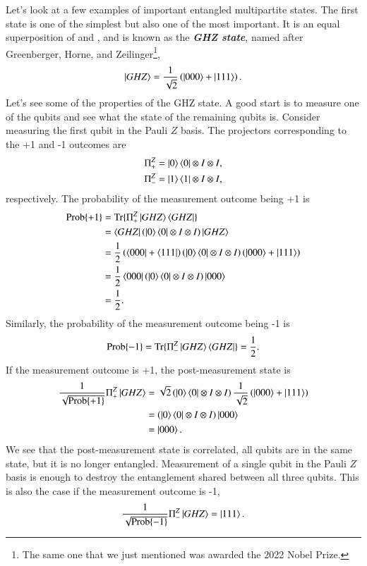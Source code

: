 Let's look at a few examples of important entangled multipartite states.
The first state is one of the simplest but also one of the most important.
It is an equal superposition of  and , and is known as the \emph{\textbf{GHZ state}}, named after Greenberger, Horne, and Zeilinger\footnote{The same one that we just mentioned was awarded the 2022 Nobel Prize.},
\begin{equation}
    \left| GHZ \right\rangle = \frac{1}{\sqrt{2}} \left( \left| 000 \right\rangle + \left| 111 \right\rangle \right).
\end{equation}
Let's see some of the properties of the GHZ state.
A good start is to measure one of the qubits and see what the state of the remaining qubits is.
Consider measuring the first qubit in the Pauli $Z$ basis.
The projectors corresponding to the +1 and -1 outcomes are
\begin{align}
    \Pi^Z_+ & = \left| 0 \right\rangle\left\langle 0 \right| \otimes I \otimes I, \\
    \Pi^Z_- & = \left| 1 \right\rangle\left\langle 1 \right| \otimes I \otimes I,
\end{align}
respectively.
The probability of the measurement outcome being +1 is
\begin{align}
    \text{Prob} \{+1\} & = \text{Tr} \{ \Pi^Z_+ \left| GHZ \right\rangle\left\langle GHZ \right| \} \nonumber\\
    & = \left\langle GHZ \right| \left( \left| 0 \right\rangle\left\langle 0 \right| \otimes I \otimes I \right) \left| GHZ \right\rangle \nonumber\\
    & = \frac{1}{2} \left( \left\langle 000 \right| + \left\langle 111 \right| \right) \left( \left| 0 \right\rangle\left\langle 0 \right| \otimes I \otimes I \right) \left( \left| 000 \right\rangle + \left| 111 \right\rangle \right) \nonumber\\
     & = \frac{1}{2} \left\langle 000 \right| \left( \left| 0 \right\rangle\left\langle 0 \right| \otimes I \otimes I \right) \left| 000 \right\rangle \nonumber\\
     & = \frac{1}{2}.
\end{align}
Similarly, the probability of the measurement outcome being -1 is
\begin{equation}
    \text{Prob}\{-1\} = \text{Tr}\{\Pi^Z_-\left| GHZ \right\rangle\left\langle GHZ \right|\} = \frac{1}{2}.
\end{equation}
If the measurement outcome is +1, the post-measurement state is
\begin{align}
    \frac{1}{\sqrt{\text{Prob}\{+1\}}} \Pi^Z_+ \left| GHZ \right\rangle & = \sqrt{2} \left( \left| 0 \right\rangle\left\langle 0 \right| \otimes I \otimes I \right) \frac{1}{\sqrt{2}} \left( \left| 000 \right\rangle + \left| 111 \right\rangle \right) \nonumber\\
    & = \left( \left| 0 \right\rangle\left\langle 0 \right| \otimes I \otimes I \right) \left| 000 \right\rangle \nonumber\\
    & = \left| 000 \right\rangle.
\end{align}
We see that the post-measurement state is correlated, all qubits are in the same state, but it is no longer entangled.
Measurement of a single qubit in the Pauli $Z$ basis is enough to destroy the entanglement shared between all three qubits.
This is also the case if the measurement outcome is -1,
\begin{equation}
    \frac{1}{\sqrt{\text{Prob}\{-1\}}} \Pi^Z_- \left| GHZ \right\rangle = \left| 111 \right\rangle.
\end{equation}

